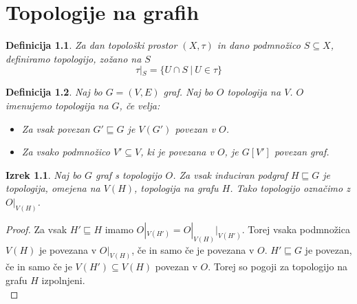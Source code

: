 \documentclass[a4paper, 12pt]{book}
\newtheorem{definition}{Definicija}[section]
\newtheorem{theorem}{Izrek}[section]
\begin{document}
\chapter{Topologije na grafih}
\begin{definition}
  Za dan topološki prostor $(X, \tau)$ in dano podmnožico $S \subseteq X$, definiramo
  topologijo, zožano na $S$ \[\tau|_S = \{U \cap S\ |\ U \in \tau\}\]
\end{definition}
\begin{definition}
  Naj bo $G = (V,E)$ graf. Naj bo $O$ topologija na $V$. $O$ imenujemo topologija
  na $G$, če velja:
  \begin{itemize}
    \item[(1)] Za vsak povezan $G' \sqsubseteq G$ je $V(G')$ povezan v $O$.
    \item[(2)] Za vsako podmnožico $V' \subseteq V$, ki je povezana v $O$, je $G[V']$ povezan graf.
  \end{itemize}
\end{definition}
\begin{theorem}\label{theorem1}
  Naj bo $G$ graf s topologijo $O$. Za vsak induciran podgraf $H \sqsubseteq G$ je topologija,
  omejena na $V(H)$, topologija na grafu $H$. Tako topologijo označimo z $O|_{V(H)}$.
\end{theorem}
\begin{proof}
  Za vsak $H' \sqsubseteq H$ imamo $O|_{V(H')} = O|_{V(H)}|_{V(H')}$. Torej vsaka
  podmnožica $V(H)$ je povezana v $O|_{V(H)}$, če in samo če je povezana v $O$.
  $H' \sqsubseteq G$ je povezan, če in samo če je $V(H') \subseteq V(H)$ povezan v $O$.
  Torej so pogoji za topologijo na grafu $H$ izpolnjeni. \\
\end{proof}
\end{document}
